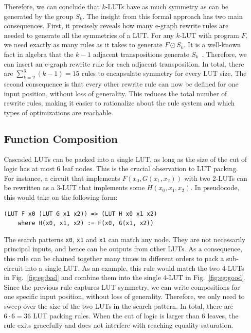 Therefore, we can conclude that $k$-LUTs have as much symmetry as can be
generated by the group $S_k$. The insight from this formal approach has two
main consequences. First, it precisely reveals how many e-graph rewrite rules
are needed to generate all the symmetries of a LUT. For any $k$-LUT with
program $F$, we need exactly as many rules as it takes to generate $F \odot
    S_k$. It is a well-known fact in algebra that the $k-1$ adjacent transpositions
generate $S_k$~\cite{sgroup}. Therefore, we can insert an e-graph rewrite rule
for each adjacent transposition. In total, there are $\sum_{k=2}^{6} (k-1) =
    15$ rules to encapsulate symmetry for every LUT size. The second consequence is
that every other rewrite rule can now be defined for one input position,
without loss of generality. This reduces the total number of rewrite rules,
making it easier to rationalize about the rule system and which types of
optimizations are reachable.

\subsection{Function Composition}\label{sec:rewrites:composition}

Cascaded LUTs can be packed into a single LUT, as long as the size of the cut
of logic has at most 6 leaf nodes. This is the crucial observation to LUT
packing. For instance, a circuit that implements $F(x_0, G(x_1, x_2))$ with two
2-LUTs can be rewritten as a 3-LUT that implements some $H(x_0, x_1, x_2)$. In
pseudocode, this would take on the following form:

\begin{lstlisting}
(LUT F x0 (LUT G x1 x2)) => (LUT H x0 x1 x2)
    where H(x0, x1, x2) := F(x0, G(x1, x2))
\end{lstlisting}

The search patterns \texttt{x0}, \texttt{x1} and \texttt{x1} can match any
node. They are not necessarily principal inputs, and hence can be outputs from
other LUTs. As a consequence, this rule can be chained together many times in
different orders to pack a sub-circuit into a single LUT. As an example, this
rule would match the two 4-LUTs in Fig.~\ref{fig:eg:bad} and combine them into
the single 4-LUT in Fig.~\ref{fig:eg:good}. Since the previous rule captures
LUT symmetry, we can write compositions for one specific input position,
without loss of generality. Therefore, we only need to sweep over the size of
the two LUTs in the search pattern. In total, there are $6 \cdot 6 = 36$ LUT
packing rules. When the cut of logic is larger than 6 leaves, the rule exits
gracefully and does not interfere with reaching equality saturation.

